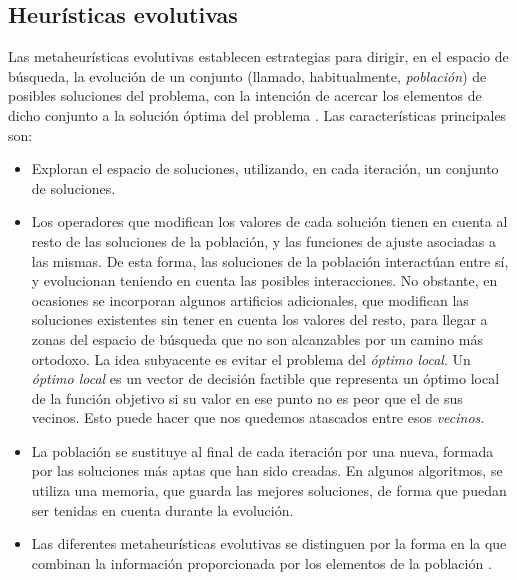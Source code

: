 \documentclass[12pt,a4paper]{book}
\begin{document}
\subsection{Heurísticas evolutivas} \label{Subsubsec: 3_3_2}
Las metaheurísticas evolutivas establecen estrategias para dirigir, en el espacio de búsqueda, la evolución de un conjunto (llamado, habitualmente, \textsl{población}) de posibles soluciones del problema, con la intención de acercar los elementos de dicho conjunto a la solución óptima del problema \cite{e_besada_optimizacion_nodate}. Las características principales son: 
\begin{itemize}
	\item Exploran el espacio de soluciones, utilizando, en cada iteración, un conjunto de soluciones.
	\item Los operadores que modifican los valores de cada solución tienen en cuenta al resto de las soluciones de la población, y las funciones de ajuste asociadas a las mismas. De esta forma, las soluciones de la población interactúan entre sí, y evolucionan teniendo en cuenta las posibles interacciones. No obstante, en ocasiones se incorporan algunos artificios adicionales, que modifican las soluciones existentes sin tener en cuenta los valores del resto, para llegar a zonas del espacio de búsqueda que no son alcanzables por un camino más ortodoxo. La idea subyacente es evitar el problema del \textsl{óptimo local}. Un \textsl{óptimo local} es un vector de decisión factible que representa un óptimo local de la función objetivo si su valor en ese punto no es peor que el de sus vecinos. Esto puede hacer que nos quedemos atascados entre esos \textsl{vecinos}.  
	\item La población se sustituye al final de cada iteración por una nueva, formada por las soluciones más aptas que han sido creadas. En algunos algoritmos, se utiliza una memoria, que guarda las mejores soluciones, de forma que puedan ser tenidas en cuenta durante la evolución.
	\item Las diferentes metaheurísticas evolutivas se distinguen por la forma en la que combinan la información proporcionada por los elementos de la población \cite{e_besada_optimizacion_nodate}.
\end{itemize}

\end{document}
